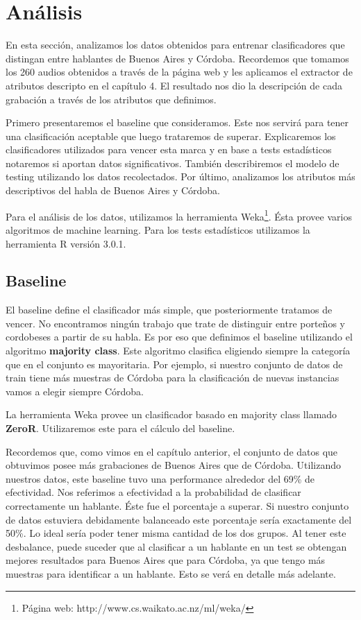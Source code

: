 
\chapter{Análisis}

En esta sección, analizamos los datos obtenidos para entrenar clasificadores que distingan entre hablantes de Buenos Aires y Córdoba. Recordemos que tomamos los 260 audios obtenidos a través de la página web y les aplicamos el extractor de atributos descripto en el capítulo 4. El resultado nos dio la descripción de cada grabación a través de los atributos que definimos. 

Primero presentaremos el baseline que consideramos. Este nos servirá para tener una clasificación aceptable que luego trataremos de superar. Explicaremos los clasificadores utilizados para vencer esta marca y en base a tests estadísticos notaremos si aportan datos significativos. También describiremos el modelo de testing utilizando los datos recolectados. Por último, analizamos los atributos más descriptivos del habla de Buenos Aires y Córdoba. 

Para el análisis de los datos, utilizamos la herramienta Weka\footnote{Página web: http://www.cs.waikato.ac.nz/ml/weka/}. Ésta provee varios algoritmos de machine learning. Para los tests estadísticos utilizamos la herramienta R versión 3.0.1. 

\section{Baseline}

El baseline define el clasificador más simple, que posteriormente tratamos de vencer. No encontramos ningún trabajo que trate de distinguir entre porteños y cordobeses a partir de su habla. Es por eso que definimos el baseline utilizando el algoritmo \textbf{majority class}. Este algoritmo clasifica eligiendo siempre la categoría que en el conjunto es mayoritaria. Por ejemplo, si nuestro conjunto de datos de train tiene más muestras de Córdoba para la clasificación de nuevas instancias vamos a elegir siempre Córdoba.

La herramienta Weka provee un clasificador basado en majority class llamado \textbf{ZeroR}. Utilizaremos este para el cálculo del baseline. 

Recordemos que, como vimos en el capítulo anterior, el conjunto de datos que obtuvimos posee más grabaciones de Buenos Aires que de Córdoba. Utilizando nuestros datos, este baseline tuvo una performance alrededor del 69\% de efectividad. Nos referimos a efectividad a la probabilidad de clasificar correctamente un hablante. Éste fue el porcentaje a superar. Si nuestro conjunto de datos estuviera debidamente balanceado este porcentaje sería exactamente del 50\%. Lo ideal sería poder tener misma cantidad de los dos grupos. Al tener este desbalance, puede suceder que al clasificar a un hablante en un test se obtengan mejores resultados para Buenos Aires que para Córdoba, ya que tengo más muestras para identificar a un hablante. Esto se verá en detalle más adelante.

